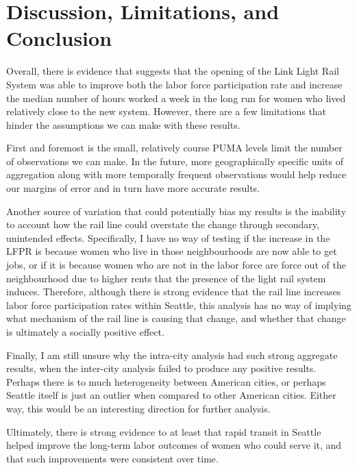 \documentclass{article}
\begin{document}
\section{Discussion, Limitations, and Conclusion}

Overall, there is evidence that suggests that the opening of the Link Light Rail System was able to improve both the labor force participation rate and increase the median number of hours worked a week in the long run for women who lived relatively close to the new system. However, there are a few limitations that hinder the assumptions we can make with these results.

First and foremost is the small, relatively course PUMA levels limit the number of observations we can make. In the future, more geographically specific units of aggregation along with more temporally frequent observations would help reduce our margins of error and in turn have more accurate results. 

Another source of variation that could potentially bias my results is the inability to account how the rail line could overstate the change through secondary, unintended effects. Specifically, I have no way of testing if the increase in the LFPR is because women who live in those neighbourhoods are now able to get jobs, or if it is because women who are not in the labor force are force out of the neighbourhood due to higher rents that the presence of the light rail system induces. Therefore, although there is strong evidence that the rail line increases labor force participation rates within Seattle, this analysis has no way of implying what mechanism of the rail line is causing that change, and whether that change is ultimately a socially positive effect. 

Finally, I am still unsure why the intra-city analysis had such strong aggregate results, when the inter-city analysis failed to produce any positive results. Perhaps there is to much heterogeneity between American cities, or perhaps Seattle itself is just an outlier when compared to other American cities. Either way, this would be an interesting direction for further analysis. 

Ultimately, there is strong evidence to at least that rapid transit in Seattle helped improve the long-term labor outcomes of women who could serve it, and that such improvements were consistent over time.
 

\end{document}
